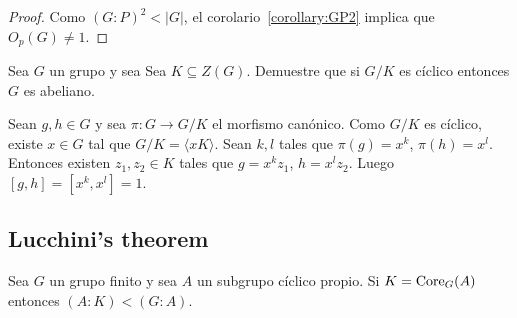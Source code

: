 \begin{proof}
	Como $(G:P)^2<|G|$, el corolario~\ref{corollary:GP2} implica que
	$O_p(G)\ne1$.
\end{proof}

\begin{exercise}
	\label{exercise:G/Z(G)}
	Sea $G$ un grupo y sea Sea $K\subseteq Z(G)$. Demuestre que si $G/K$ es
	cíclico entonces $G$ es abeliano.
\end{exercise}

\begin{svgraybox}
	Sean $g,h\in G$ y sea $\pi\colon G\to G/K$ el morfismo canónico. Como $G/K$
	es cíclico, existe $x\in G$ tal que $G/K=\langle xK\rangle$. Sean $k,l$ tales que 
	$\pi(g)=x^k$, $\pi(h)=x^l$. Entonces existen $z_1,z_2\in K$ tales que 
	$g=x^kz_1$, $h=x^lz_2$. Luego $[g,h]=[x^k,x^l]=1$. 
\end{svgraybox}



\subsection{Lucchini's theorem}

\begin{theorem}[Lucchini]
	\label{theorem:Lucchini}
	Sea $G$ un grupo finito y sea $A$ un subgrupo cíclico propio. Si
	$K=\operatorname{Core}_G(A)$ entonces $(A:K)<(G:A)$.
\end{theorem}

